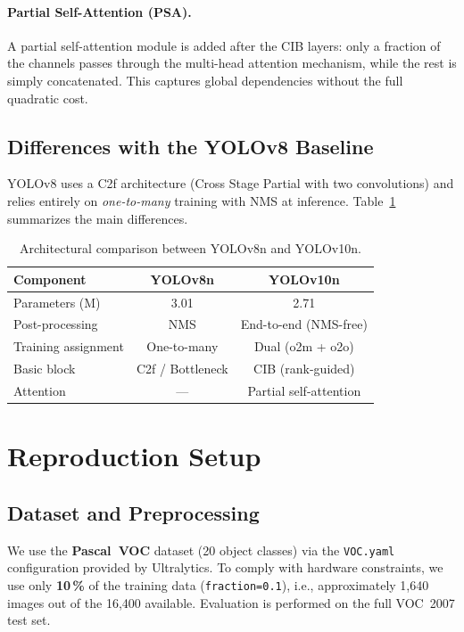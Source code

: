 \documentclass[11pt,a4paper]{article}
\begin{document}
\paragraph{Partial Self-Attention (PSA).}
A partial self-attention module is added after the CIB layers: only a fraction of the channels passes through the multi-head attention mechanism, while the rest is simply concatenated. This captures global dependencies without the full quadratic cost.

\subsection{Differences with the YOLOv8 Baseline}

YOLOv8 uses a C2f architecture (Cross Stage Partial with two convolutions) and relies entirely on \emph{one-to-many} training with NMS at inference. Table~\ref{tab:archi_diff} summarizes the main differences.

\begin{table}[H]
\centering
\caption{Architectural comparison between YOLOv8n and YOLOv10n.}
\label{tab:archi_diff}
\begin{tabular}{lcc}
\toprule
\textbf{Component} & \textbf{YOLOv8n} & \textbf{YOLOv10n} \\
\midrule
Parameters (M)        & 3.01  & 2.71  \\
Post-processing       & NMS   & End-to-end (NMS-free) \\
Training assignment   & One-to-many & Dual (o2m + o2o) \\
Basic block           & C2f / Bottleneck & CIB (rank-guided) \\
Attention             & --- & Partial self-attention \\
\bottomrule
\end{tabular}
\end{table}

\section{Reproduction Setup}

\subsection{Dataset and Preprocessing}

We use the \textbf{Pascal~VOC} dataset (20 object classes) via the \texttt{VOC.yaml} configuration provided by Ultralytics. To comply with hardware constraints, we use only \textbf{10\,\%} of the training data (\texttt{fraction=0.1}), i.e., approximately 1,640 images out of the 16,400 available. Evaluation is performed on the full VOC~2007 test set.
\end{document}
